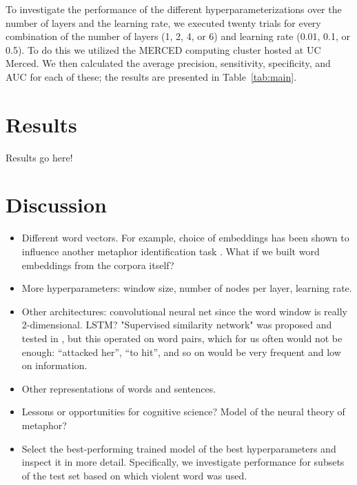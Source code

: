\documentclass[11pt,letterpaper]{article}
\begin{document}
To investigate the performance of the different hyperparameterizations over
the number of layers and the learning rate, we executed twenty trials for
every combination of the number of layers (1, 2, 4, or 6) and learning rate
(0.01, 0.1, or 0.5). To do this we utilized the MERCED computing cluster hosted
at UC Merced. We then calculated the average precision, sensitivity, specificity,
and AUC for each of these; the results are presented in Table~\ref{tab:main}.

\section{Results}\label{results}

Results go here!
% 

\section{Discussion}\label{discussion}

\begin{itemize}
  \item Different word vectors. For example, choice of embeddings has been
    shown to influence another metaphor identification task \cite{Rei2017}.
    What if we built word embeddings from the corpora itself?
  \item More hyperparameters: window size, number of nodes per layer, learning
    rate.
  \item Other architectures: convolutional neural net since the word window
    is really 2-dimensional. LSTM? "Supervised similarity network" was 
    proposed and tested in \cite{Rei2017}, but this operated on word pairs,
    which for us often would not be enough: ``attacked her'', ``to hit'', and
    so on would be very frequent and low on information.
  \item Other representations of words and sentences.
  \item Lessons or opportunities for cognitive science? Model of the neural
    theory of metaphor?
  \item Select the best-performing trained model of the best hyperparameters and
inspect it in more detail. Specifically, we investigate performance for 
subsets of the test set based on which violent word was used. 
\end{itemize}



\end{document}
